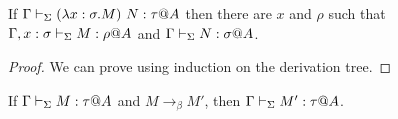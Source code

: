 \begin{lemma}
	\begin{item}
	      \item If $\G \V (\lambda x:\sigma.M)\ N: \tau@A$ then there are $x$ and $\rho$ such that
	      $\Gamma, x:\sigma \vdash_\Sigma M : \rho @A$ and $\Gamma \vdash_\Sigma N:\sigma @ A$.
	\end{item}
\end{lemma}

\begin{proof}
	We can prove using induction on the derivation tree.
\end{proof}
	
\begin{theorem}
	If $\G\V M:\tau@A$ and $M \longrightarrow_{\beta} M'$, then $\G\V M':\tau@A$.
\end{theorem}
	
